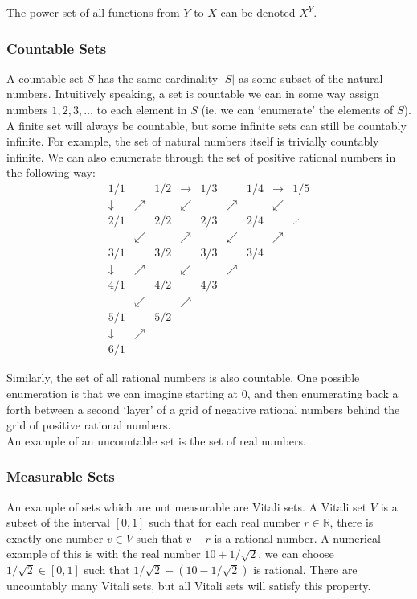 \documentclass[11pt]{report} %
\begin{document}
The power set of all functions from $Y$ to $X$ can be denoted $X^{Y}$.

\subsubsection{Countable Sets}
A countable set $S$ has the same cardinality $\left|S\right|$ as some subset of the natural numbers. Intuitively speaking, a set is countable we can in some way assign numbers $1, 2, 3, \dots$ to each element in $S$ (ie. we can `enumerate' the elements of $S$). A finite set will always be countable, but some infinite sets can still be countably infinite. For example, the set of natural numbers itself is trivially countably infinite. We can also enumerate through the set of positive rational numbers in the following way:
\begin{equation*}
\begin{array}{ccccccccc}
1/1 &  & 1/2 & \rightarrow & 1/3 &  & 1/4 & \rightarrow & 1/5\\
\downarrow & \nearrow &  & \swarrow &  & \nearrow &  & \swarrow\\
2/1 &  & 2/2 &  & 2/3 &  & 2/4 &  & \iddots\\
 & \swarrow &  & \nearrow &  & \swarrow &  & \nearrow\\
3/1 &  & 3/2 &  & 3/3 &  & 3/4\\
\downarrow & \nearrow &  & \swarrow &  & \nearrow\\
4/1 &  & 4/2 &  & 4/3\\
 & \swarrow &  & \nearrow\\
5/1 &  & 5/2\\
\downarrow & \nearrow\\
6/1
\end{array}
\end{equation*}

Similarly, the set of all rational numbers is also countable. One possible enumeration is that we can imagine starting at 0, and then enumerating back a forth between a second `layer' of a grid of negative rational numbers behind the grid of positive rational numbers. \\

An example of an uncountable set is the set of real numbers.

\subsubsection{Measurable Sets}
An example of sets which are not measurable are Vitali sets. A Vitali set $V$ is a subset of the interval $\left[0, 1\right]$ such that for each real number $r \in \mathbb{R}$, there is exactly one number $v \in V$ such that $v - r$ is a rational number. A numerical example of this is with the real number $10 + 1/\sqrt{2}$, we can choose $1/\sqrt{2} \in \left[0, 1\right]$ such that $1/\sqrt{2} - \left(10 - 1/\sqrt{2}\right)$ is rational. There are uncountably many Vitali sets, but all Vitali sets will satisfy this property. \\
\end{document}

